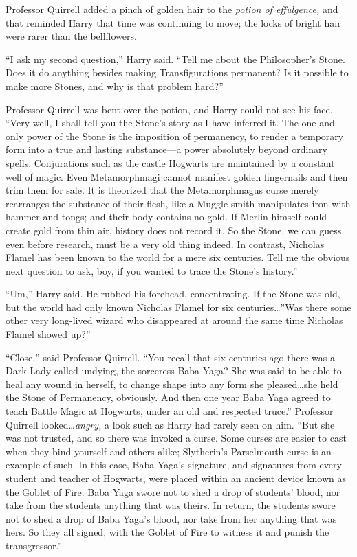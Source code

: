 Professor Quirrell added a pinch of golden hair to the \emph{potion of
effulgence,} and that reminded Harry that time was continuing to move; the
locks of bright hair were rarer than the bellflowers.

“I ask my second question,” Harry said. “Tell me about the Philosopher’s Stone.
Does it do anything besides making Transfigurations permanent? Is it possible
to make more Stones, and why is that problem hard?”

Professor Quirrell was bent over the potion, and Harry could not see his face.
“Very well, I shall tell you the Stone’s story as I have inferred it. The one
and only power of the Stone is the imposition of permanency, to render a
temporary form into a true and lasting substance—a power absolutely beyond
ordinary spells. Conjurations such as the castle Hogwarts are maintained by a
constant well of magic. Even Metamorphmagi cannot manifest golden fingernails
and then trim them for sale. It is theorized that the Metamorphmagus curse
merely rearranges the substance of their flesh, like a Muggle smith manipulates
iron with hammer and tongs; and their body contains no gold. If Merlin himself
could create gold from thin air, history does not record it. So the Stone, we
can guess even before research, must be a very old thing indeed. In contrast,
Nicholas Flamel has been known to the world for a mere six centuries. Tell me
the obvious next question to ask, boy, if you wanted to trace the Stone’s
history.”

“Um,” Harry said. He rubbed his forehead, concentrating. If the Stone was old,
but the world had only known Nicholas Flamel for six centuries…”Was
there some other very long-lived wizard who disappeared at around the same time
Nicholas Flamel showed up?”

“Close,” said Professor Quirrell. “You recall that six centuries ago there was
a Dark Lady called undying, the sorceress Baba Yaga? She was said to be able to
heal any wound in herself, to change shape into any form she pleased…she
held the Stone of Permanency, obviously. And then one year Baba Yaga agreed
to teach Battle Magic at Hogwarts, under an old and respected truce.” Professor
Quirrell looked…\emph{angry,} a look such as Harry had rarely seen on
him. “But she was not trusted, and so there was invoked a curse. Some curses
are easier to cast when they bind yourself and others alike; Slytherin’s
Parselmouth curse is an example of such. In this case, Baba Yaga’s signature,
and signatures from every student and teacher of Hogwarts, were placed within
an ancient device known as the Goblet of Fire. Baba Yaga swore not to shed a
drop of students’ blood, nor take from the students anything that was theirs.
In return, the students swore not to shed a drop of Baba Yaga’s blood, nor take
from her anything that was hers. So they all signed, with the Goblet of Fire to
witness it and punish the transgressor.”

